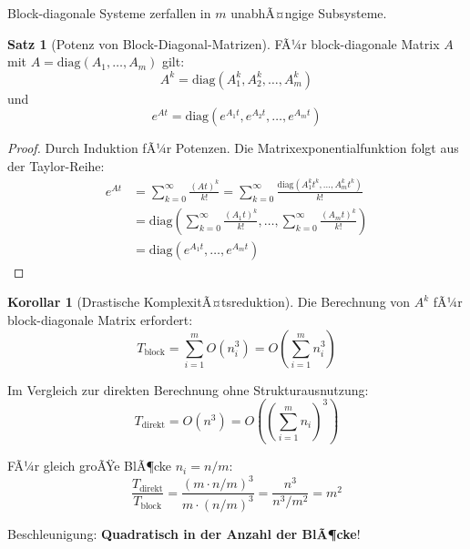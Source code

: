 ﻿\documentclass[a4paper,12pt]{report}
\theoremstyle{definition}
\newtheorem{satz}{Satz}
\newtheorem{korollar}{Korollar}
\begin{document}
	Block-diagonale Systeme zerfallen in $m$ unabhÃ¤ngige Subsysteme.
	
	\begin{satz}[Potenz von Block-Diagonal-Matrizen]
		FÃ¼r block-diagonale Matrix $A$ mit $A = \text{diag}(A_1, \ldots, A_m)$ gilt:
		\[
		A^k = \text{diag}(A_1^k, A_2^k, \ldots, A_m^k)
		\]
		und
		\[
		e^{At} = \text{diag}(e^{A_1 t}, e^{A_2 t}, \ldots, e^{A_m t})
		\]
	\end{satz}
	
	\begin{proof}
		Durch Induktion fÃ¼r Potenzen. Die Matrixexponentialfunktion folgt aus der Taylor-Reihe:
		\begin{align}
			e^{At} &= \sum_{k=0}^\infty \frac{(At)^k}{k!} = \sum_{k=0}^\infty \frac{\text{diag}(A_1^k t^k, \ldots, A_m^k t^k)}{k!} \\
			&= \text{diag}\left(\sum_{k=0}^\infty \frac{(A_1 t)^k}{k!}, \ldots, \sum_{k=0}^\infty \frac{(A_m t)^k}{k!}\right) \\
			&= \text{diag}(e^{A_1 t}, \ldots, e^{A_m t})
		\end{align}
	\end{proof}
	
	\begin{korollar}[Drastische KomplexitÃ¤tsreduktion]
		Die Berechnung von $A^k$ fÃ¼r block-diagonale Matrix erfordert:
		\[
		T_{\text{block}} = \sum_{i=1}^m O(n_i^3) = O\left(\sum_{i=1}^m n_i^3\right)
		\]
		
		Im Vergleich zur direkten Berechnung ohne Strukturausnutzung:
		\[
		T_{\text{direkt}} = O(n^3) = O\left(\left(\sum_{i=1}^m n_i\right)^3\right)
		\]
		
		FÃ¼r gleich groÃŸe BlÃ¶cke $n_i = n/m$:
		\[
		\frac{T_{\text{direkt}}}{T_{\text{block}}} = \frac{(m \cdot n/m)^3}{m \cdot (n/m)^3} = \frac{n^3}{n^3/m^2} = m^2
		\]
		
		Beschleunigung: \textbf{Quadratisch in der Anzahl der BlÃ¶cke}!
	\end{korollar}
	
\end{document}
